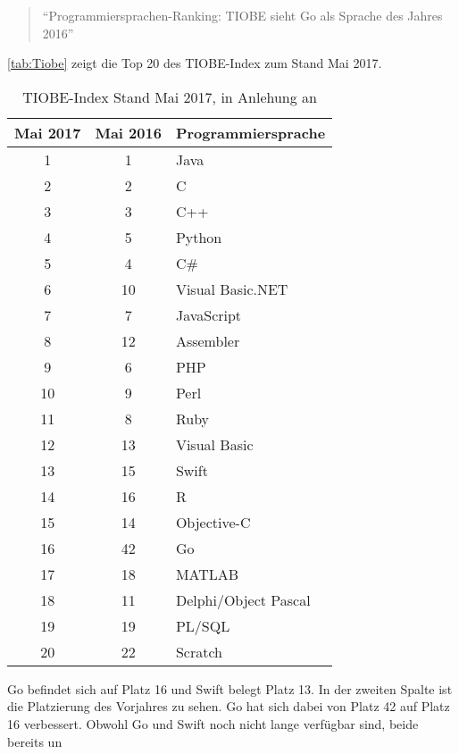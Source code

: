 \begin{quote}
\enquote{Programmiersprachen-Ranking: TIOBE sieht Go als Sprache des Jahres 2016}\cite{MengeSonnentag}
\end{quote}

\autoref{tab:Tiobe} zeigt die Top 20 des TIOBE-Index zum Stand Mai 2017. 

\begin{table}[H]
    \centering
    \begin{tabularx}{\textwidth}{|c|c|X|}
    \hline 
    \rowcolor[gray]{0.75} \textbf{Mai 2017} & \textbf{Mai 2016} & \textbf{Programmiersprache} \\
    \hline
    1 & 1 & Java \\
    \hline
    2 & 2 & C \\
    \hline
    3 & 3 & C++ \\
    \hline
    4 & 5 & Python \\
    \hline
    5 & 4 & C\# \\
    \hline
    6 & 10 & Visual Basic.NET \\
    \hline
    7 & 7 & JavaScript \\
    \hline
    8 & 12 & Assembler \\
    \hline
    9 & 6 & PHP \\
    \hline
    10 & 9 & Perl \\
    \hline
    11 & 8 & Ruby \\
    \hline
    12 & 13 & Visual Basic \\
    \hline
    13 & 15 & Swift \\
    \hline
    14 & 16 & R \\
    \hline
    15 & 14 & Objective-C \\
    \hline
    16 & 42 & Go \\
    \hline
    17 & 18 & MATLAB \\	
    \hline
    18 & 11 & Delphi/Object Pascal \\	
    \hline
    19 & 19 & PL/SQL \\	
    \hline
    20 & 22 & Scratch \\	
    \hline
    \end{tabularx}
    \caption{TIOBE-Index Stand Mai 2017, in Anlehung an \cite{Tiobe}}
    \label{tab:Tiobe}
\end{table}

Go befindet sich auf Platz 16 und Swift belegt Platz 13. 
In der zweiten Spalte ist die Platzierung des Vorjahres zu sehen. 
Go hat sich dabei von Platz 42 auf Platz 16 verbessert.
Obwohl Go und Swift noch nicht lange verfügbar sind, beide bereits un

